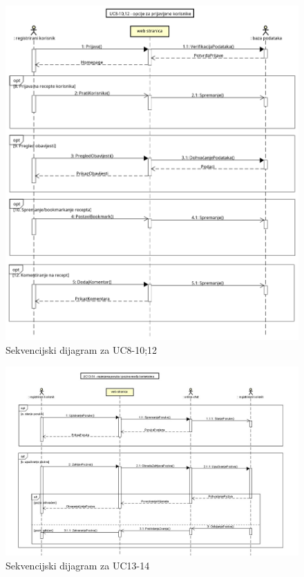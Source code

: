 				\begin{figure}[H]
					\centering
					\includegraphics[width=1.1\linewidth]{"slike/dijagrami/Seq 8-10,12"}
					\caption{Sekvencijski dijagram za UC8-10;12}
					\label{fig:seq-8-10;12}
				\end{figure}
				
				\begin{figure}[H]
					\centering
					\includegraphics[width=1.1\linewidth]{"slike/dijagrami/Seq 13-14"}
					\caption{Sekvencijski dijagram za UC13-14}
					\label{fig:seq-13-14}
				\end{figure}
				
